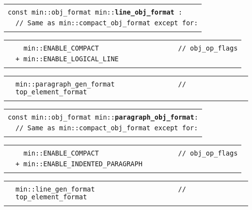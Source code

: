 \documentclass[12pt]{article}
\makeatletter
\newcommand{\TT}[1]{{\tt \bfseries #1}}
\newcommand{\ttindex}[1]{\index{#1@{\tt #1}}}
\newenvironment{indpar}[1][0.3in]%
	{\begin{list}{}%
		     {\setlength{\itemsep}{0in}%
		      \setlength{\topsep}{0in}%
		      \setlength{\parsep}{1ex}%
		      \setlength{\labelwidth}{#1}%
		      \setlength{\leftmargin}{#1}%
		      \addtolength{\leftmargin}{\labelsep}}%
	 \item}%
	{\end{list}}
\newcommand{\LABEL}[1]{\label{#1}}
\newlength{\ARGBREAKLENGTH}
\newcommand{\ARGBREAK}[1][\ARGBREAKLENGTH]{\\&\hspace*{#1}}
\newcommand{\MINKEY}[1]%
	   {\TT{#1}\ttindex{min::#1}\ttindex{#1}}
\newcommand{\MINLKEY}[2]%
           {\TT{#1#2}\index{min::#1@{\tt min::#1}!#2@{\tt #2}}%
                     \index{#1@{\tt #1}!#2@{\tt #2}}}
\makeatother
\begin{document}
\begin{indpar}[1em]

\begin{tabular}{r@{}l}\hspace*{0.1in} \\[-3ex]
\multicolumn{2}{l}{\tt const min::obj\_format
                   min::\MINLKEY{line}{\_obj\_format}:}%
\LABEL{MIN::LINE_OBJ_FORMAT}\ARGBREAK
\verb|// Same as min::compact_obj_format except for:|\ARGBREAK
\end{tabular}

\vspace{-4ex}\begin{tabular}{r@{}l}\hspace*{0.1in}\ARGBREAK
\verb|  min::ENABLE_COMPACT                    // obj_op_flags|\ARGBREAK
\verb|+ min::ENABLE_LOGICAL_LINE|\ARGBREAK
\end{tabular}

\vspace{-4ex}\begin{tabular}{r@{}l}\hspace*{0.1in}\ARGBREAK
\verb|min::paragraph_gen_format                // top_element_format|\ARGBREAK
\end{tabular}

\end{indpar}

\begin{indpar}[1em]

\begin{tabular}{r@{}l}\hspace*{0.1in} \\[-3ex]
\multicolumn{2}{l}{\tt const min::obj\_format
                   min::\MINKEY{paragraph\_obj\_format}:}%
\LABEL{MIN::PARAGRAPH_OBJ_FORMAT}\ARGBREAK
\verb|// Same as min::compact_obj_format except for:|\ARGBREAK
\end{tabular}

\vspace{-4ex}\begin{tabular}{r@{}l}\hspace*{0.1in}\ARGBREAK
\verb|  min::ENABLE_COMPACT                    // obj_op_flags|\ARGBREAK
\verb|+ min::ENABLE_INDENTED_PARAGRAPH|\ARGBREAK
\end{tabular}

\vspace{-4ex}\begin{tabular}{r@{}l}\hspace*{0.1in}\ARGBREAK
\verb|min::line_gen_format                     // top_element_format|\ARGBREAK
\end{tabular}

\end{indpar}
\end{document}

